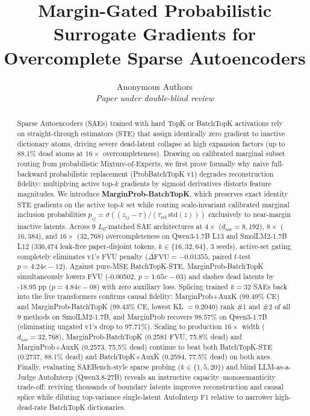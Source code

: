 \documentclass[10pt,twocolumn]{article}
\title{\Large\bfseries Margin-Gated Probabilistic Surrogate Gradients for Overcomplete Sparse Autoencoders}
\author{Anonymous Authors \\ \textit{Paper under double-blind review}}
\date{}
\begin{document}
\maketitle
\begin{abstract}
Sparse Autoencoders (SAEs) trained with hard TopK or BatchTopK activations rely on straight-through estimators (STE) that assign identically zero gradient to inactive dictionary atoms, driving severe dead-latent collapse at high expansion factors (up to 88.1\% dead atoms at $16\times$ overcompleteness). Drawing on calibrated marginal subset routing from probabilistic Mixture-of-Experts, we first prove formally why naive full-backward probabilistic replacement (ProbBatchTopK v1) degrades reconstruction fidelity: multiplying active top-$k$ gradients by sigmoid derivatives distorts feature magnitudes. We introduce \textbf{MarginProb-BatchTopK}, which preserves exact identity STE gradients on the active top-$k$ set while routing scale-invariant calibrated marginal inclusion probabilities $p_{ij} = \sigma((z_{ij} - \tau)/(\tau_{\mathrm{rel}}\,\mathrm{std}(z)))$ exclusively to near-margin inactive latents. Across 9 $L_0$-matched SAE architectures at $4\times$ ($d_{\mathrm{sae}}=8{,}192$), $8\times$ ($16{,}384$), and $16\times$ ($32{,}768$) overcompleteness on Qwen3-1.7B L13 and SmolLM2-1.7B L12 (336,474 leak-free paper-disjoint tokens, $k \in \{16,32,64\}$, 3 seeds), active-set gating completely eliminates v1's FVU penalty ($\Delta\mathrm{FVU} = -0.01355$, paired $t$-test $p=4.24e-12$). Against pure-MSE BatchTopK-STE, MarginProb-BatchTopK simultaneously lowers FVU (-0.00502, $p=1.65e-03$) and slashes dead latents by -18.95 pp ($p=4.84e-08$) with zero auxiliary loss. Splicing trained $k=32$ SAEs back into the live transformers confirms causal fidelity: MarginProb+AuxK (99.49\% CE) and MarginProb-BatchTopK (99.43\% CE, lowest KL $=0.2040$) rank \#1 and \#2 of all 9 methods on SmolLM2-1.7B, and MarginProb recovers 98.57\% on Qwen3-1.7B (eliminating ungated v1's drop to 97.71\%). Scaling to production $16\times$ width ($d_{\mathrm{sae}}=32{,}768$), MarginProb-BatchTopK (0.2581 FVU, 75.8\% dead) and MarginProb+AuxK (0.2573, 75.5\% dead) continue to beat both BatchTopK-STE (0.2737, 88.1\% dead) and BatchTopK+AuxK (0.2594, 77.5\% dead) on both axes. Finally, evaluating SAEBench-style sparse probing ($k \in \{1,5,20\}$) and blind LLM-as-a-Judge AutoInterp (Qwen3.8-27B) reveals an instructive capacity--monosemanticity trade-off: reviving thousands of boundary latents improves reconstruction and causal splice while diluting top-variance single-latent AutoInterp F1 relative to narrower high-dead-rate BatchTopK dictionaries.
\end{abstract}
\end{document}
